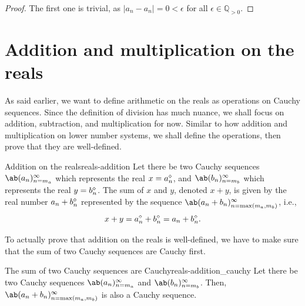 \begin{proof}
  The first one is trivial, as \(|a_n - a_n| = 0 < \epsilon\) for all
  \(\epsilon \in \mathbb{Q}_{>0}\).
\end{proof}

\section{Addition and multiplication on the reals}

As said earlier, we want to define arithmetic on the reals as operations on Cauchy
sequences. Since the definition of division has much nuance, we shall focus on addition,
subtraction, and multiplication for now. Similar to how addition and multiplication on
lower number systems, we shall define the operations, then prove that they are well-defined.

\begin{df}{Addition on the reals}{reals-addition}
  Let there be two Cauchy sequences $\sequence{a_n}{n = m_a}{\infty}$ which
  represents the real $x = a_n^{\diamond}$, and $\sequence{b_n}{n = m_b}{\infty}$ which
  represents the real $y = b_n^{\diamond}$. The sum of $x$ and $y$, denoted $x + y$, is
  given by the real number $a_n + b_n^{\diamond}$ represented by the sequence
  $\sequence{a_n + b_n}{n = \max(m_a, m_b)}{\infty}$, i.e.,
  \begin{equation}
    x + y = a_n^{\diamond} + b_n^{\diamond} = a_n + b_n^{\diamond}.
  \end{equation}
\end{df}

To actually prove that addition on the reals is well-defined, we have to make sure that
the sum of two Cauchy sequences are Cauchy first.
\begin{lemma}{The sum of two Cauchy sequences are Cauchy}{reals-addition_cauchy}
  Let there be two Cauchy sequences $\sequence{a_n}{n = m_a}{\infty}$ and
  $\sequence{b_n}{n = m_b}{\infty}$. Then, $\sequence{a_n + b_n}{n = \max(m_a, m_b)}{\infty}$
  is also a Cauchy sequence.
\end{lemma}

